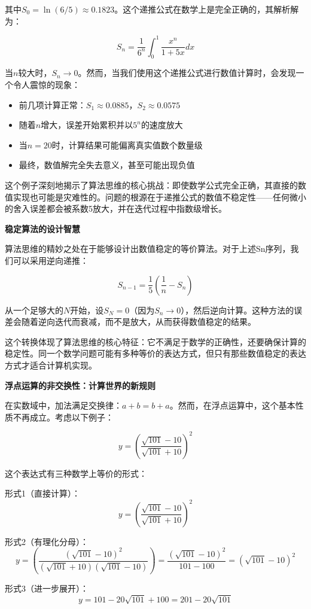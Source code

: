 其中$S_0 = \ln(6/5) \approx 0.1823$。这个递推公式在数学上是完全正确的，其解析解为：

$$S_n = \frac{1}{6^n} \int_0^1 \frac{x^n}{1+5x} dx$$

当$n$较大时，$S_n \to 0$。然而，当我们使用这个递推公式进行数值计算时，会发现一个令人震惊的现象：

\begin{itemize}
\item 前几项计算正常：$S_1 \approx 0.0885$，$S_2 \approx 0.0575$
\item 随着$n$增大，误差开始累积并以$5^n$的速度放大
\item 当$n=20$时，计算结果可能偏离真实值数个数量级
\item 最终，数值解完全失去意义，甚至可能出现负值
\end{itemize}

这个例子深刻地揭示了算法思维的核心挑战：即使数学公式完全正确，其直接的数值实现也可能是灾难性的。问题的根源在于递推公式的数值不稳定性——任何微小的舍入误差都会被系数5放大，并在迭代过程中指数级增长。

\textbf{稳定算法的设计智慧}

算法思维的精妙之处在于能够设计出数值稳定的等价算法。对于上述Sn序列，我们可以采用逆向递推：

$$S_{n-1} = \frac{1}{5}\left(\frac{1}{n} - S_n\right)$$

从一个足够大的$N$开始，设$S_N = 0$（因为$S_n \to 0$），然后逆向计算。这种方法的误差会随着逆向迭代而衰减，而不是放大，从而获得数值稳定的结果。

这个转换体现了算法思维的核心特征：它不满足于数学的正确性，还要确保计算的稳定性。同一个数学问题可能有多种等价的表达方式，但只有那些数值稳定的表达方式才适合计算机实现。

\textbf{浮点运算的非交换性：计算世界的新规则}

在实数域中，加法满足交换律：$a + b = b + a$。然而，在浮点运算中，这个基本性质不再成立。考虑以下例子：

$$y = \left(\frac{\sqrt{101} - 10}{\sqrt{101} + 10}\right)^2$$

这个表达式有三种数学上等价的形式：

形式1（直接计算）：
$$y = \left(\frac{\sqrt{101} - 10}{\sqrt{101} + 10}\right)^2$$

形式2（有理化分母）：
$$y = \left(\frac{(\sqrt{101} - 10)^2}{(\sqrt{101} + 10)(\sqrt{101} - 10)}\right) = \frac{(\sqrt{101} - 10)^2}{101 - 100} = (\sqrt{101} - 10)^2$$

形式3（进一步展开）：
$$y = 101 - 20\sqrt{101} + 100 = 201 - 20\sqrt{101}$$


